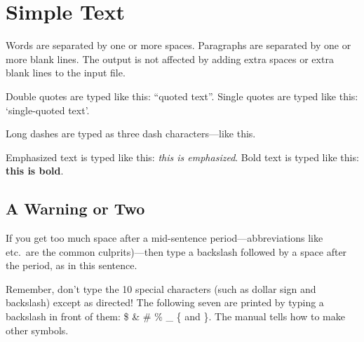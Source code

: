 \documentclass{article}        %
\begin{document}


\section{Simple Text}          %

Words are separated by one or more spaces.  Paragraphs are separated by
one or more blank lines.  The output is not affected by adding extra
spaces or extra blank lines to the input file.

Double quotes are typed like this: ``quoted text''.
Single quotes are typed like this: `single-quoted text'.

Long dashes are typed as three dash characters---like this.

Emphasized text is typed like this: \emph{this is emphasized}.
Bold       text is typed like this: \textbf{this is bold}.

\subsection{A Warning or Two}  %

If you get too much space after a mid-sentence period---abbreviations
like etc.\ are the common culprits)---then type a backslash followed by
a space after the period, as in this sentence.

Remember, don't type the 10 special characters (such as dollar sign and
backslash) except as directed!  The following seven are printed by
typing a backslash in front of them:  \$  \&  \#  \%  \_  \{  and  \}.  
The manual tells how to make other symbols.
\end{document}
